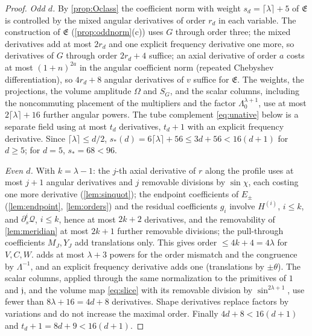 \documentclass[11pt]{amsart}
\numberwithin{equation}{section}
\theoremstyle{definition}
\theoremstyle{remark}
\begin{document}
\begin{proof}
\emph{Odd $d$.} By \cref{prop:Oclass} the coefficient norm with weight $s_d=\lceil\lambda\rceil+5$ of $\mathfrak E$ is controlled by the mixed angular derivatives of order $r_d$ in each variable. The construction of $\mathfrak E$ (\cref{prop:oddnorm}(c)) uses $G$ through order three; the mixed derivatives add at most $2r_d$ and one explicit frequency derivative one more, so derivatives of $G$ through order $2r_d+4$ suffice; an axial derivative of order $a$ costs at most $(1+n)^{2a}$ in the angular coefficient norm (repeated Chebyshev differentiation), so $4r_d+8$ angular derivatives of $v$ suffice for $\mathfrak E$. The weights, the projections, the volume amplitude $\Omega$ and $S_G$, and the scalar columns, including the noncommuting placement of the multipliers and the factor $\Lambda_0^{\lambda+1}$, use at most $2\lceil\lambda\rceil+16$ further angular powers. The tube complement \eqref{eq:unative} below is a separate field using at most $t_d$ derivatives, $t_d+1$ with an explicit frequency derivative. Since $\lceil\lambda\rceil\le d/2$, $s_*(d)=6\lceil\lambda\rceil+56\le3d+56<16(d+1)$ for $d\ge5$; for $d=5$, $s_*=68<96$.

\emph{Even $d$.} With $k=\lambda-1$: the $j$-th axial derivative of $r$ along the profile uses at most $j+1$ angular derivatives and $j$ removable divisions by $\sin\chi$, each costing one more derivative (\cref{lem:sinquot}); the endpoint coefficients of $E_\pm$ (\cref{lem:endpoint}, \cref{lem:orders}) and the residual coefficients $g_i$ involve $H^{(i)}$, $i\le k$, and $\partial_s^i\mathcal Q$, $i\le k$, hence at most $2k+2$ derivatives, and the removability of \cref{lem:meridian} at most $2k+1$ further removable divisions; the pull-through coefficients $M_J,Y_J$ add translations only. This gives order $\le4k+4=4\lambda$ for $V,C,W$.  adds at most $\lambda+3$ powers for the order mismatch and the congruence by $\Lambda^{-1}$, and an explicit frequency derivative adds one (translations by $\pm\theta$). The scalar columns, applied through the same normalization to the primitives of $1$ and $\mathfrak j$, and the volume map \eqref{eq:slice} with its removable division by $\sin^{2\lambda+1}$, use fewer than $8\lambda+16=4d+8$ derivatives. Shape derivatives replace factors by variations and do not increase the maximal order. Finally $4d+8<16(d+1)$ and $t_d+1=8d+9<16(d+1)$.
\end{proof}
\end{document}
